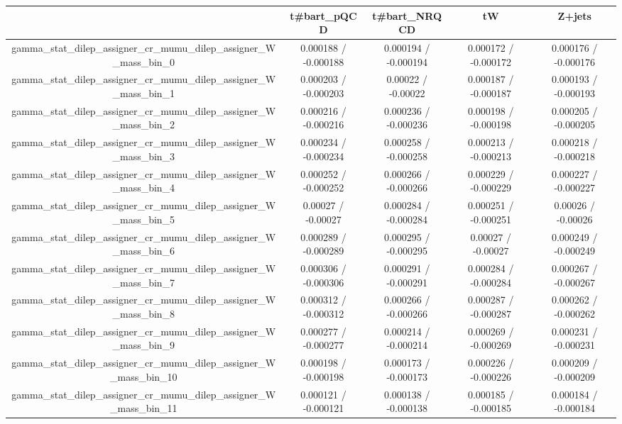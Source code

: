 \documentclass[10pt]{article}
\begin{document}
\begin{table}[htbp]
\begin{center}
\begin{tabular}{|c|c|c|c|c|}
\hline 
      & t#bar{t}_{pQCD}      & t#bar{t}_{NRQCD}      & tW      & Z+jets \\ 
\hline 
  gamma_stat_dilep_assigner_cr_mumu_dilep_assigner_W_mass_bin_0 & 0.000188 / -0.000188 & 0.000194 / -0.000194 & 0.000172 / -0.000172 & 0.000176 / -0.000176 \\ 
  gamma_stat_dilep_assigner_cr_mumu_dilep_assigner_W_mass_bin_1 & 0.000203 / -0.000203 & 0.00022 / -0.00022 & 0.000187 / -0.000187 & 0.000193 / -0.000193 \\ 
  gamma_stat_dilep_assigner_cr_mumu_dilep_assigner_W_mass_bin_2 & 0.000216 / -0.000216 & 0.000236 / -0.000236 & 0.000198 / -0.000198 & 0.000205 / -0.000205 \\ 
  gamma_stat_dilep_assigner_cr_mumu_dilep_assigner_W_mass_bin_3 & 0.000234 / -0.000234 & 0.000258 / -0.000258 & 0.000213 / -0.000213 & 0.000218 / -0.000218 \\ 
  gamma_stat_dilep_assigner_cr_mumu_dilep_assigner_W_mass_bin_4 & 0.000252 / -0.000252 & 0.000266 / -0.000266 & 0.000229 / -0.000229 & 0.000227 / -0.000227 \\ 
  gamma_stat_dilep_assigner_cr_mumu_dilep_assigner_W_mass_bin_5 & 0.00027 / -0.00027 & 0.000284 / -0.000284 & 0.000251 / -0.000251 & 0.00026 / -0.00026 \\ 
  gamma_stat_dilep_assigner_cr_mumu_dilep_assigner_W_mass_bin_6 & 0.000289 / -0.000289 & 0.000295 / -0.000295 & 0.00027 / -0.00027 & 0.000249 / -0.000249 \\ 
  gamma_stat_dilep_assigner_cr_mumu_dilep_assigner_W_mass_bin_7 & 0.000306 / -0.000306 & 0.000291 / -0.000291 & 0.000284 / -0.000284 & 0.000267 / -0.000267 \\ 
  gamma_stat_dilep_assigner_cr_mumu_dilep_assigner_W_mass_bin_8 & 0.000312 / -0.000312 & 0.000266 / -0.000266 & 0.000287 / -0.000287 & 0.000262 / -0.000262 \\ 
  gamma_stat_dilep_assigner_cr_mumu_dilep_assigner_W_mass_bin_9 & 0.000277 / -0.000277 & 0.000214 / -0.000214 & 0.000269 / -0.000269 & 0.000231 / -0.000231 \\ 
  gamma_stat_dilep_assigner_cr_mumu_dilep_assigner_W_mass_bin_10 & 0.000198 / -0.000198 & 0.000173 / -0.000173 & 0.000226 / -0.000226 & 0.000209 / -0.000209 \\ 
  gamma_stat_dilep_assigner_cr_mumu_dilep_assigner_W_mass_bin_11 & 0.000121 / -0.000121 & 0.000138 / -0.000138 & 0.000185 / -0.000185 & 0.000184 / -0.000184 \\ 

\end{tabular}
\end{center}
\end{table}
\end{document}
